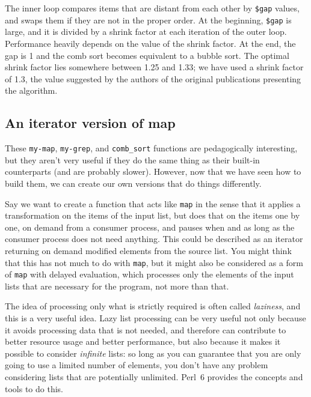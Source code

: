 The inner loop compares items that are distant from each 
other by \verb'$gap' values, and swaps them if they are 
not in the proper order. At the beginning, \verb'$gap' 
is large, and it is divided by a shrink factor at each 
iteration of the outer loop. Performance heavily depends
on the value of the shrink factor. At the end, the gap 
is 1 and the comb sort becomes equivalent to a bubble 
sort. The optimal shrink factor lies somewhere between 1.25 
and 1.33; we have used a shrink factor of 1.3, the value 
suggested by the authors of the original publications 
presenting the algorithm.

\subsection{An iterator version of map}

These {\tt my-map}, {\tt my-grep}, and {\tt comb\_sort} 
functions are pedagogically interesting, but they aren't 
very useful if they do the same thing as their built-in 
counterparts (and are probably slower). However, now 
that we have seen how to build them, we can create our 
own versions that do things differently.

Say we want to create a function that acts like 
{\tt map} in the sense that it applies a 
transformation on the items of the input list, but does 
that on the items one by one, on demand from a consumer 
process, and pauses when and as long as the consumer process 
does not need anything. This could be described as an 
iterator returning on demand modified elements from the 
source list. You might think that this has not much to 
do with {\tt map}, but it might also be considered as 
a form of {\tt map} with delayed evaluation, which 
processes only the elements of the input lists that are 
necessary for the program, not more than that. 

The idea 
of processing only what is strictly required is often called 
\emph{laziness}, and this is a very useful idea. Lazy 
list processing can be very useful not only because it 
avoids processing data that is not needed, and therefore 
can contribute to better resource usage and better 
performance, but also because it makes it possible to consider 
\emph{infinite} lists: so long as you can guarantee that 
you are only going to use a limited number of elements, 
you don't have any problem considering lists that are 
potentially unlimited. Perl~6 provides the concepts and 
tools to do this.

